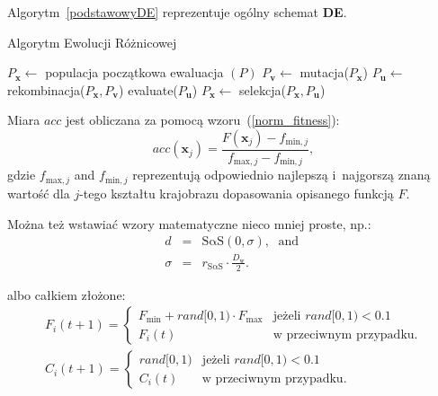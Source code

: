 \documentclass[final,a4paper,openany,12pt]{mwbk}
\begin{document}
Algorytm~\ref{podstawowyDE} reprezentuje ogólny schemat \textbf{DE}.
\begin{algorithm}[h!]
\caption{Algorytm Ewolucji Różnicowej} \label{podstawowyDE}
\begin{algorithmic}
\State $P_{\textbf{x}} \leftarrow $ populacja początkowa
\State ewaluacja $(P)$
\Repeat
\State $P_{\textbf{v}} \leftarrow $ mutacja($P_{\textbf{x}}$)
\State $P_{\textbf{u}} \leftarrow $ rekombinacja($P_{\textbf{x}},P_{\textbf{v}}$)
\State evaluate($P_{\textbf{u}}$)
\State $P_{\textbf{x}} \leftarrow $ selekcja($P_{\textbf{x}}, P_{\textbf{u}}$)
\newline
\end{algorithmic}
\end{algorithm}

Miara $acc$ jest obliczana za pomocą wzoru~(\ref{norm_fitness}):
\begin{equation}
acc(\textbf{x}_j)  = \frac{F(\textbf{x}_j)-f_{\mathrm{min},j}}{f_{\mathrm{max},j}-f_{\mathrm{min},j}}, \label{norm_fitness}
\end{equation}
gdzie $f_{\mathrm{max},j}$ and $f_{\mathrm{min},j}$ reprezentują odpowiednio najlepszą i~najgorszą znaną wartość dla $j$-tego kształtu krajobrazu dopasowania opisanego funkcją $F$.
\vspace{2mm}

Można też wstawiać wzory matematyczne nieco mniej proste, np.:
\begin{eqnarray}
d & = & \mathrm{S\alpha S}(0,\sigma), \; \mbox{ and }\label{aqq1}\\
\sigma & = & r_{\mathrm{S\alpha S}}  \cdot \frac{D_{\mathrm{w}}}{2}.\label{aqq2}
\end{eqnarray}

albo całkiem złożone:
\begin{eqnarray}
F_i(t+1) = \left\lbrace \begin{array}{ll}
F_\mathrm{min} + rand[0,1)\cdot F_\mathrm{max}& \textrm{jeżeli $rand[0,1) < 0.1$}\\
F_{i}(t) & \textrm{w przeciwnym przypadku.} \end{array} \right.\\
C_i(t+1) = \left\lbrace \begin{array}{ll}
rand[0,1)& \textrm{jeżeli $rand[0,1) < 0.1$}\\
C_{i}(t) & \textrm{w przeciwnym przypadku.} \end{array} \right.
\end{eqnarray}
\end{document}
